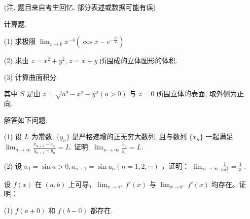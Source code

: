 (注. 题目来自考生回忆, 部分表述或数据可能有误)\par
\par{}
计算题.\par
(1) 求极限  $\lim_{x\to0}x^{-4}\left(\cos x-e^{-\frac{x^{2}}{2}}\right)$\par
(2) 求由 $z = x^{2} + y^{2}$, $z = x + y$ 所围成的立体图形的体积.\par
\par{}
(3) 计算曲面积分\par
\nopagebreak[4]
其中 $S$ 是由 $z = \sqrt{a^2 - x^2 - y^2} (a > 0)$ 与 $z = 0$ 所围立体的表面, 取外侧为正向.\par
\par{}
解答如下问题:\par
(1) 设 $L$ 为常数, $\{y_{n}\}$ 是严格递增的正无穷大数列, 且与数列 $\{x_{n}\}$ 一起满足 $\lim_{n\to \infty}\frac{x_{n + 1} - x_n}{y_{n + 1} - y_n} = L$. 证明: $\lim_{n\to \infty}\frac{x_n}{y_n} = L$.\par
(2) 设  $a_{1} = \sin a > 0, a_{n+1} = \sin a_{n} (n = 1, 2, \cdots)$ ，证明： $\lim_{n \to \infty} \frac{1}{na_{n}^{2}} = \frac{1}{3}$ .\par
\par{}
设 $f(x)$ 在 $(a, b)$ 上可导，$\lim_{x \to a^{+}} f'(x)$ 与 $\lim_{x \to b^{-}} f'(x)$ 均存在。证明：\par
(1) $f(a + 0)$ 和 $f(b - 0)$ 都存在.\par
